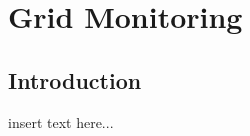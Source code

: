 \graphicspath{{chapt_dutch/}{intro/}{chapt2/}{chapt3/}{chapt4/}{chapt5/}}

\renewcommand\evenpagerightmark{{\scshape\small Grid Monitoring}}
\renewcommand\oddpageleftmark{{\scshape\small Chapter 2}}

\renewcommand{\bibname}{References}

\hyphenation{}

\chapter[Grid Monitoring]%
 {Grid Monitoring}
\label{ch2}

\section{Introduction}
insert text here...

\lipsum

\clearpage




\clearpage{\pagestyle{empty}\cleardoublepage}
